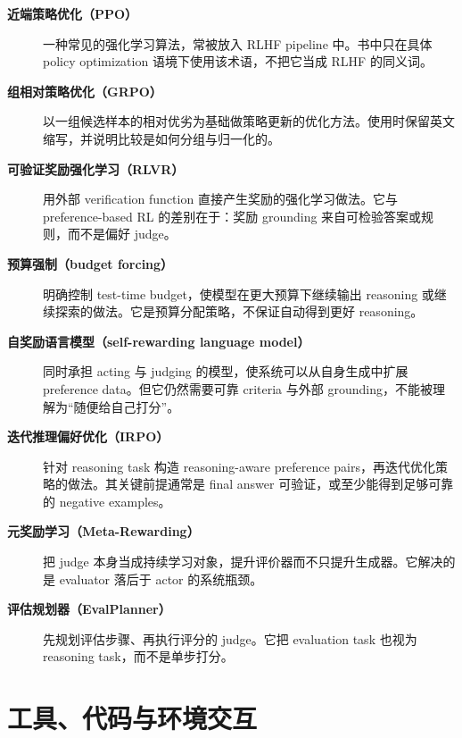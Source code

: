 \begin{description}
\item[\textbf{近端策略优化（PPO）}] 一种常见的强化学习算法，常被放入 RLHF pipeline 中。书中只在具体 policy optimization 语境下使用该术语，不把它当成 RLHF 的同义词。

\item[\textbf{组相对策略优化（GRPO）}] 以一组候选样本的相对优劣为基础做策略更新的优化方法。使用时保留英文缩写，并说明比较是如何分组与归一化的。

\item[\textbf{可验证奖励强化学习（RLVR）}] 用外部 verification function 直接产生奖励的强化学习做法。它与 preference-based RL 的差别在于：奖励 grounding 来自可检验答案或规则，而不是偏好 judge。

\item[\textbf{预算强制（budget forcing）}] 明确控制 test-time budget，使模型在更大预算下继续输出 reasoning 或继续探索的做法。它是预算分配策略，不保证自动得到更好 reasoning。

\item[\textbf{自奖励语言模型（self-rewarding language model）}] 同时承担 acting 与 judging 的模型，使系统可以从自身生成中扩展 preference data。但它仍然需要可靠 criteria 与外部 grounding，不能被理解为“随便给自己打分”。

\item[\textbf{迭代推理偏好优化（IRPO）}] 针对 reasoning task 构造 reasoning-aware preference pairs，再迭代优化策略的做法。其关键前提通常是 final answer 可验证，或至少能得到足够可靠的 negative examples。

\item[\textbf{元奖励学习（Meta-Rewarding）}] 把 judge 本身当成持续学习对象，提升评价器而不只提升生成器。它解决的是 evaluator 落后于 actor 的系统瓶颈。

\item[\textbf{评估规划器（EvalPlanner）}] 先规划评估步骤、再执行评分的 judge。它把 evaluation task 也视为 reasoning task，而不是单步打分。
\end{description}

\section{工具、代码与环境交互}

